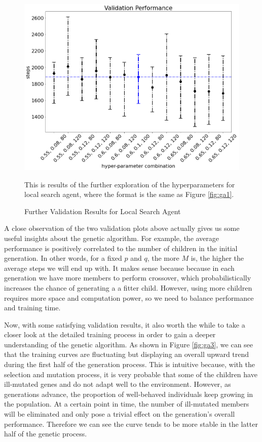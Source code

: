 \documentclass[letterpaper]{article} %
\begin{document}
\begin{itemize}
  \begin{figure}[h!]
    \centering
    \includegraphics[width=0.9\linewidth]{figures/GA2}
    \caption{Further Validation Results for Local Search Agent}
    \medskip
    \footnotesize
    This is results of the further exploration of the hyperparameters for local search agent, where the format is the same as Figure \ref{fig:ga1}.
    \label{fig:ga2}
  \end{figure}
  
  A close observation of the two validation plots above actually gives us some useful insights about the genetic algorithm. For example, the average performance is positively correlated to the number of children in the initial generation. In other words, for a fixed $p$ and $q$, the more $M$ is, the higher the average steps we will end up with. It makes sense because because in each generation we have more members to perform crossover, which probabilistically increases the chance of generating a a fitter child. However, using more children requires more space and computation power, so we need to balance performance and training time. 

  Now, with some satisfying validation results, it also worth the while to take a closer look at the detailed training process in order to gain a deeper understanding of the genetic algorithm. As shown in Figure \ref{fig:ga3}, we can see that the training curves are fluctuating but displaying an overall upward trend during the first half of the generation process. This is intuitive because, with the selection and mutation process, it is very probable that some of the children have ill-mutated genes and do not adapt well to the environment. However, as generations advance, the proportion of well-behaved individuals keep growing in the population. At a certain point in time, the number of ill-mutated members will be eliminated and only pose a trivial effect on the generation's overall performance. Therefore we can see the curve tends to be more stable in the latter half of the genetic process. 


\end{itemize}
\end{document}
